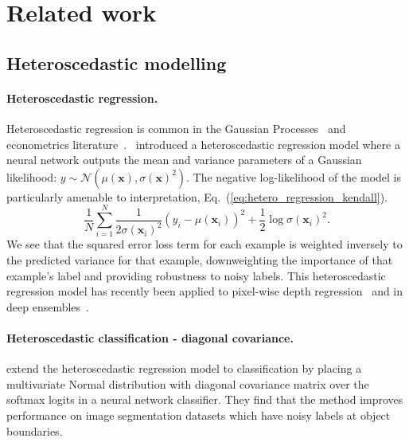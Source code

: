 \documentclass[final]{cvpr}
\begin{document}
\section{Related work}
\label{sec:related_work}

\subsection{Heteroscedastic modelling}

\paragraph{Heteroscedastic regression.}
Heteroscedastic regression is common in the Gaussian Processes~\cite{williams2006gaussian} and econometrics literature~\cite{train2009discrete}.~\citet{bishop1997regression} introduced a heteroscedastic regression model where a neural network outputs the mean and variance parameters of a Gaussian likelihood: $y \sim \mathcal{N}(\mu(\mathbf{x}), \sigma(\mathbf{x})^2)$. The negative log-likelihood of the model is particularly amenable to interpretation, Eq.\ (\ref{eq:hetero_regression_kendall}).
\begin{equation}
    \frac{1}{N} \sum_{i=1}^{N} \frac{1}{2 \sigma(\mathbf{x}_i)^2} (y_i - \mu(\mathbf{x}_i))^2 + \frac{1}{2} \log \sigma(\mathbf{x}_i)^2.
\label{eq:hetero_regression_kendall}
\end{equation}
We see that the squared error loss term for each example is weighted inversely to the predicted variance for that example, downweighting the importance of that example's label and providing robustness to noisy labels. This heteroscedastic regression model has recently been applied to pixel-wise depth regression~\cite{kendall2017uncertainties} and in deep ensembles~\cite{lakshminarayanan2017simple}.

\paragraph{Heteroscedastic classification - diagonal covariance.}
\citet{kendall2017uncertainties} extend the heteroscedastic regression model to classification by placing a multivariate Normal distribution with diagonal covariance matrix over the softmax logits in a neural network classifier. They find that the method improves performance on image segmentation datasets which have noisy labels at object boundaries.
\end{document}
